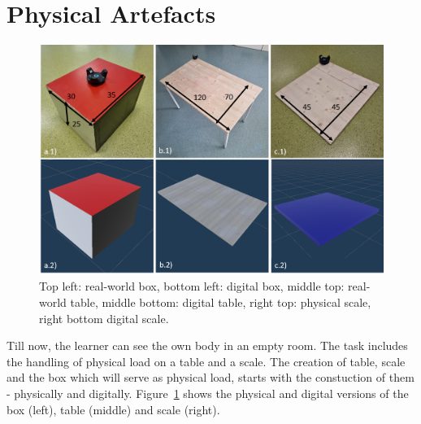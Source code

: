\section{Physical Artefacts}
\label{sec:artefacts}
\begin{figure}[H]
	\centering
	\includegraphics[width=\textwidth]{figures/artefacts.png}	
	\caption[Physical artefacts]{Top left: real-world box, bottom left: digital box, middle top: real-world table, middle bottom: digital table, right top: physical scale, right bottom digital scale.}
	\label{fig:artefacts}
\end{figure}
Till now, the learner can see the own body in an empty room. The task includes the handling of physical load on a table and a scale. The creation of table, scale and the box which will serve as physical load, starts with the constuction of them - physically and digitally. Figure~\ref{fig:artefacts} shows the physical and digital versions of the box (left), table (middle) and scale (right).\\
